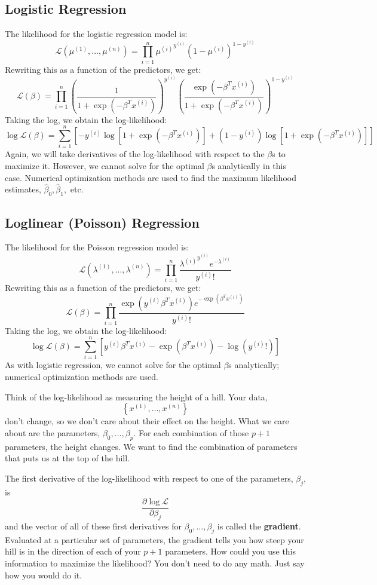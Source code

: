 \subsection{Logistic Regression}

The likelihood for the logistic regression model is:
$$ \mathcal{L}(\mu^{(1)}, \dots, \mu^{(n)}) = \prod_{i=1}^n {\mu^{(i)}}^{y^{(i)}} (1-\mu^{(i)})^{1 - y^{(i)}} $$
Rewriting this as a function of the predictors, we get:
$$ \mathcal{L}(\beta) = \prod_{i=1}^n \left( \frac{1}{1 + \exp(-\beta^T x^{(i)})} \right)^{y^{(i)}} \left( \frac{\exp(-\beta^T x^{(i)})}{1 + \exp(-\beta^T x^{(i)})} \right)^{1 - y^{(i)}} $$
Taking the log, we obtain the log-likelihood:
$$ \log \mathcal{L}(\beta) = \sum_{i=1}^n \left[ -y^{(i)} \log \left[ 1 + \exp(-\beta^T x^{(i)}) \right] + (1 -y^{(i)}) \log \left[ 1 + \exp(-\beta^T x^{(i)}) \right] \right] $$
Again, we will take derivatives of the log-likelihood with respect to the $\beta$s to maximize it. However, we cannot solve for the optimal $\beta$s analytically in this case. Numerical optimization methods are used to find the maximum likelihood estimates, $\hat{\beta}_0, \hat{\beta}_1,$ etc.

\subsection{Loglinear (Poisson) Regression}

The likelihood for the Poisson regression model is:
$$ \mathcal{L}(\lambda^{(1)}, \dots, \lambda^{(n)}) = \prod_{i=1}^n \frac{{\lambda^{(i)}}^{y^{(i)}} e^{-\lambda^{(i)}}}{y^{(i)}!} $$
Rewriting this as a function of the predictors, we get:
$$ \mathcal{L}(\beta) = \prod_{i=1}^n \frac{\exp{(y^{(i)} \beta^T x^{(i)})} e^{-\exp{(\beta^T x^{(i)})}}}{y^{(i)}!} $$
Taking the log, we obtain the log-likelihood:
$$ \log \mathcal{L}(\beta) = \sum_{i=1}^n \left[ y^{(i)} \beta^T x^{(i)} - \exp(\beta^T x^{(i)}) - \log (y^{(i)}!) \right] $$
As with logistic regression, we cannot solve for the optimal $\beta$s analytically; numerical optimization methods are used. 
\vspace{1mm}

\begin{question}{}
Think of the log-likelihood as measuring the height of a hill. Your data, 
$$\left\{x^{(1)},\dots,x^{(n)}\right\}$$ 
don't change, so we don't care about their effect on the height. What we care about are the parameters, $\beta_0, \dots, \beta_p$. For each combination of those $p+1$ parameters, the height changes. We want to find the combination of parameters that puts us at the top of the hill. 

The first derivative of the log-likelihood with respect to one of the parameters, $\beta_j$, is
$$ \frac{\partial \log \mathcal{L}}{\partial \beta_j} $$
and the vector of all of these first derivatives for $\beta_0, \dots, \beta_j$ is called the \textbf{gradient}. Evaluated at a particular set of parameters, the gradient tells you how steep your hill is in the direction of each of your $p+1$ parameters. How could you use this information to maximize the likelihood? You don't need to do any math. Just say how you would do it.
\end{question}

